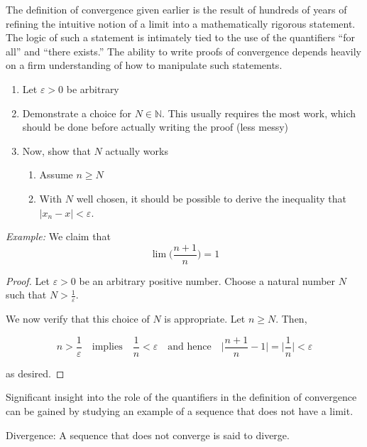 


The  definition of convergence given earlier is the result of hundreds of years of refining the intuitive notion of a limit into a mathematically rigorous statement.  The logic of such a statement is intimately tied to the use of the quantifiers ``for all'' and ``there exists.''  The ability to write proofs of convergence depends heavily on a firm understanding of how to manipulate such statements.

	\begin{enumerate}
			\item Let $\varepsilon>0$ be arbitrary
			\item  Demonstrate a choice for $N \in \mathbb{N}$.  This usually requires the most work, which should be done before actually writing the proof (less messy)
			\item Now, show that $N$ actually works
				\begin{enumerate}
						\item Assume $n \geq N$
						\item With $N$ well chosen, it should be possible to derive the inequality that $|x_{n} - x| < \varepsilon$.
				\end{enumerate}
	\end{enumerate}


\noindent \emph{Example:}  We claim that $$ \lim \bigg( \frac{n+1}{n} \bigg) = 1 $$

\begin{proof}
Let $\varepsilon >0$ be an arbitrary positive number.  Choose a natural number $N$ such that $ N > \frac{1}{\varepsilon}	$.


We now verify that this choice of $N$ is appropriate.  Let $n \geq N$.  Then,

$$	n> \frac{1}{\varepsilon}	  \quad \text{implies} \quad \frac{1}{n} < \varepsilon \quad \text{and hence} \quad \bigg|  \frac{n+1}{n}  -1  \bigg|  = \bigg|  \frac{1}{n} \bigg|< \varepsilon$$

as desired.
\end{proof}



Significant insight into the role of the quantifiers in the definition of convergence
can be gained by studying an example of a sequence that does not have a limit.

\begin{definition}Divergence:  A sequence that does not converge is said to diverge. \end{definition}


